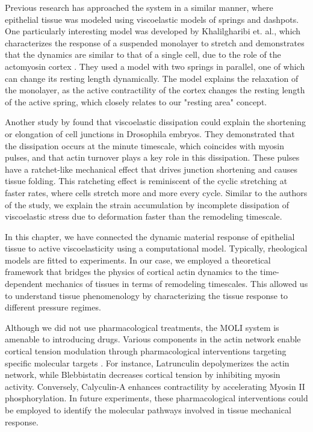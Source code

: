 Previous research has approached the system in a similar manner, where
epithelial tissue was modeled using viscoelastic models of springs and
dashpots. One particularly interesting model was developed by
Khalilgharibi et. al., which characterizes the response of a suspended
monolayer to stretch and demonstrates that the dynamics are similar to
that of a single cell, due to the role of the actomyosin cortex
\cite{khalilgharibi2019}. They used a model with two springs in
parallel, one of which can change its resting length dynamically. The
model explains the relaxation of the monolayer, as the active
contractility of the cortex changes the resting length of the active
spring, which closely relates to our "resting area" concept.

Another study by \cite{clement2017} found that viscoelastic
dissipation could explain the shortening or elongation of cell junctions
in Drosophila embryos. They demonstrated that the dissipation occurs at
the minute timescale, which coincides with myosin pulses, and that actin
turnover plays a key role in this dissipation. These pulses have a
ratchet-like mechanical effect that drives junction shortening and
causes tissue folding. This ratcheting effect is reminiscent of the
cyclic stretching at faster rates, where cells stretch more and more
every cycle. Similar to the authors of the study, we explain the strain
accumulation by incomplete dissipation of viscoelastic stress due to
deformation faster than the remodeling timescale.

In this chapter, we have connected the dynamic material response of
epithelial tissue to active viscoelasticity using a computational model.
Typically, rheological models are fitted to experiments. In our case, we
employed a theoretical framework that bridges the physics of cortical
actin dynamics to the time-dependent mechanics of tissues in terms of
remodeling timescales. This allowed us to understand tissue
phenomenology by characterizing the tissue response to different
pressure regimes.

Although we did not use pharmacological treatments, the MOLI system is
amenable to introducing drugs. Various components in the actin network
enable cortical tension modulation through pharmacological interventions
targeting specific molecular targets \cite{cartagena-rivera2016}.
For instance, Latrunculin depolymerizes the actin network, while
Blebbistatin decreases cortical tension by inhibiting myosin activity.
Conversely, Calyculin-A enhances contractility by accelerating Myosin II
phosphorylation. In future experiments, these pharmacological
interventions could be employed to identify the molecular pathways
involved in tissue mechanical response.

